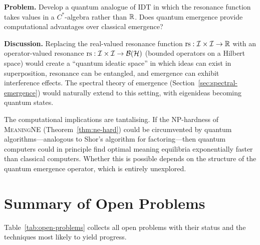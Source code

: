 \begin{game}
\label{op:quantum}
\textbf{Problem.}  Develop a quantum analogue of IDT in which the
resonance function takes values in a $C^*$-algebra rather than $\mathbb{R}$.
Does quantum emergence provide computational advantages over classical
emergence?

\textbf{Discussion.}  Replacing the real-valued resonance function
$\mathrm{rs} : \mathcal{I} \times \mathcal{I} \to \mathbb{R}$ with an operator-valued resonance
$\mathrm{rs} : \mathcal{I} \times \mathcal{I} \to \mathcal{B}(\mathcal{H})$ (bounded operators
on a Hilbert space) would create a ``quantum ideatic space'' in which
ideas can exist in superposition, resonance can be entangled, and
emergence can exhibit interference effects.  The spectral theory of
emergence (Section~\ref{sec:spectral-emergence}) would naturally extend
to this setting, with eigenideas becoming quantum states.

The computational implications are tantalising.  If the NP-hardness of
\textsc{MeaningNE} (Theorem~\ref{thm:ne-hard}) could be circumvented
by quantum algorithms---analogous to Shor's algorithm for factoring---then
quantum computers could in principle find optimal meaning equilibria
exponentially faster than classical computers.  Whether this is possible
depends on the structure of the quantum emergence operator, which is
entirely unexplored.
\end{game}

\section{Summary of Open Problems}
\label{sec:open-summary}

Table~\ref{tab:open-problems} collects all open problems with
their status and the techniques most likely to yield progress.

